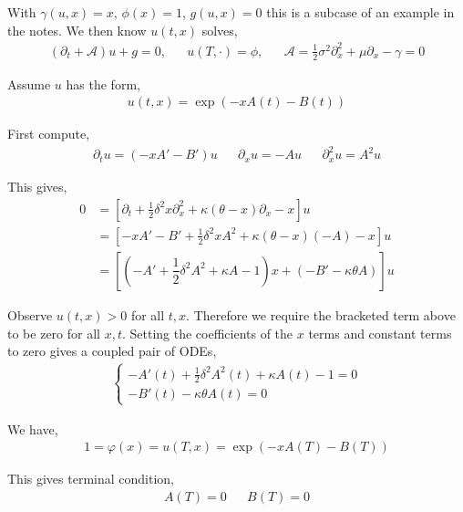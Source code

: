 \begin{solution}[Solution]
With \( \gamma(u,x) = x \), \( \phi(x) = 1 \), \( g(u,x) = 0 \) this is a subcase of an example in the notes. We then know \( u(t,x) \) solves,
\begin{align*}
    (\partial_t + \mathcal{A})u + g = 0, && u(T,\cdot) = \phi, && \mathcal{A} = \frac{1}{2} \sigma^2 \partial_x^2 + \mu \partial_x-\gamma = 0
\end{align*}

Assume \( u \) has the form,
\begin{align*}
    u(t,x) = \exp \left( -x A(t) - B(t) \right)
\end{align*}

First compute,
\begin{align*}
    \partial_t u = (-xA'-B')u &&
    \partial_x u = -A u &&
    \partial_x^2 u = A^2 u
\end{align*}

This gives,
\begin{align*}
    0 &= \left[\partial_t + \frac{1}{2} \delta^2 x \partial_x^2 + \kappa(\theta-x) \partial_x - x \right] u  \\
    &= \left[ - xA'-B' + \frac{1}{2} \delta^2 x A^2 + \kappa(\theta-x) (-A) - x \right] u \\
    &=  \left[\left(-A'+\dfrac{1}{2}\delta^2A^2 + \kappa A - 1\right) x + \left( -B' - \kappa\theta A \right) \right] u
\end{align*}

Observe \( u(t,x) > 0 \) for all \( t,x \). Therefore we require the bracketed term above to be zero for all \( x, t \). Setting the coefficients of the \( x \) terms and constant terms to zero gives a coupled pair of ODEs,
\begin{align*}
    \begin{cases}
        -A'(t)+\frac{1}{2}\delta^2A^2(t) + \kappa A(t) - 1 = 0 \\
        -B'(t) - \kappa\theta A(t)  = 0
    \end{cases}
\end{align*}

We have,
\begin{align*}
    1 = \varphi(x) = u(T,x) = \exp \left( -xA(T) - B(T) \right)
\end{align*}

This gives terminal condition,
\begin{align*}
    A(T) = 0 &&  B(T) = 0
\end{align*}



\end{solution}
